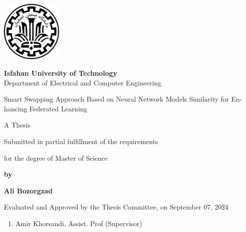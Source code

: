 \thispagestyle{empty}
\begin{latin}
\begin{center}
\includegraphics[height=3cm]{iut_logo.png}
\vspace{0.4cm}

{\large\textbf{Isfahan University of Technology}}\\

\vspace{0.4cm}
Department of Electrical and Computer Engineering

\vspace{2.5cm}

{\Huge
	Smart Swapping Approach Based on Neural Network Models Similarity for Enhancing Federated Learning
}

\vspace{1.5cm}

{\large
	A Thesis
	
	\vspace{.3cm}
	
	Submitted in partial fulfillment of the requirements
	
	\vspace{.3cm}
	
	for the degree of Master of Science
}

	\vspace{1.5cm}

{\Large
	\textbf{by}
	
	\vspace{.3cm}
	
	\textbf{Ali Bozorgzad}
}
\end{center}

\vfill

Evaluated and Approved by the Thesis Committee, on September 07, 2024
\vspace{0.5cm}

\begin{enumerate}
\item Amir Khorsandi, Assist. Prof (Supervisor)
\vspace{0.5cm}


\end{enumerate}
\end{latin}
